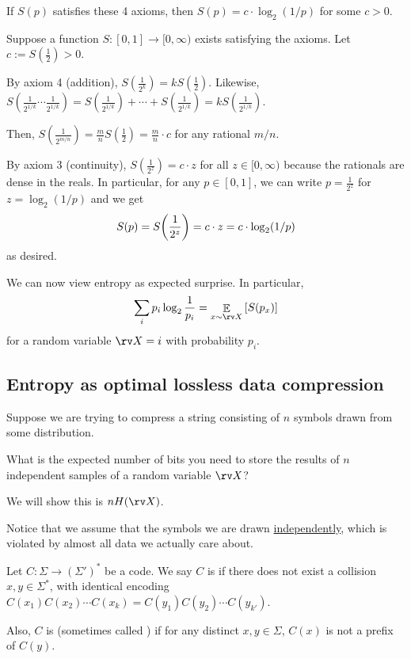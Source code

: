 \documentclass[notes,tikz]{agony}
\DeclareMathOperator*{\E}{\mathbb{E}}
\begin{document}
\begin{prop}
  If $S(p)$ satisfies these 4 axioms, then $S(p)=c\cdot \log_2(1/p)$ for some $c > 0$.
\end{prop}
\begin{prf}
  Suppose a function $S : [0,1] \to [0,\infty)$ exists satisfying the axioms.
  Let $c := S(\frac12) > 0$.

  By axiom 4 (addition), $S(\frac{1}{2^k}) = kS(\frac12)$.
  Likewise, $S(\frac{1}{2^{1/k}}\cdots\frac{1}{2^{1/k}})
    = S(\frac{1}{2^{1/k}}) + \dotsb + S(\frac{1}{2^{1/k}}) = kS(\frac{1}{2^{1/k}})$.

  Then, $S(\frac{1}{2^{m/n}}) = \frac{m}{n}S(\frac12) = \frac{m}{n}\cdot c$
  for any rational $m/n$.

  By axiom 3 (continuity), $S(\frac{1}{2^z}) = c \cdot z$ for all $z \in [0,\infty)$
  because the rationals are dense in the reals.
  In particular, for any $p \in [0,1]$,
  we can write $p = \frac{1}{2^z}$ for $z = \log_2(1/p)$
  and we get \[ S\qty(p) = S\qty(\frac{1}{2^z}) = c \cdot z = c \cdot \log_2(1/p) \]
  as desired.
\end{prf}

We can now view entropy as expected surprise. In particular,
\[ \sum_i p_i \log_2\frac{1}{p_i} = \E_{x \sim \rv X}\qty[S(p_x)] \]
for a random variable $\rv X = i$ with probability $p_i$.

\subsection{Entropy as optimal lossless data compression}

Suppose we are trying to compress a string consisting of $n$
symbols drawn from some distribution.

\begin{problem}
  What is the expected number of bits you need to store the results of $n$ independent samples
  of a random variable $\rv X$?
\end{problem}

We will show this is $nH(\rv X)$.

Notice that we assume that the symbols we are drawn \uline{independently},
which is violated by almost all data we actually care about.

\begin{defn}
  Let $C : \Sigma \to (\Sigma')^*$ be a code.
  We say $C$ is  if there does not exist
  a collision $x, y \in \Sigma^*$,
  with identical encoding $C(x_1)C(x_2)\cdots C(x_k) = C(y_1)C(y_2)\cdots C(y_{k'})$.

  Also, $C$ is  (sometimes called )
  if for any distinct $x,y \in \Sigma$, $C(x)$ is not a prefix of $C(y)$.
\end{defn}
\end{document}
